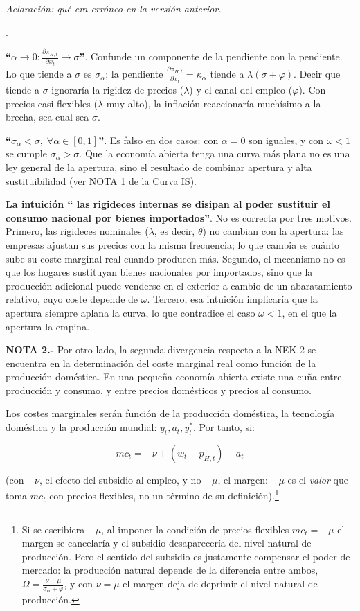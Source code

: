 \documentclass[10pt,a4paper]{article}
\newcounter{numitem}
\newenvironment{lnum}
      {\begin{list}{\arabic{numitem}.}{%
          \usecounter{numitem}%
          \setlength{\leftmargin}{1cm}%
          \setlength{\parskip}{3pt}%
          \setlength{\itemsep}{0pt}%
          \setlength{\parsep}{0pt}%
      }}
      {\end{list}}
\begin{document}
\textit{Aclaración: qué era erróneo en la versión anterior.}
\begin{lnum}
    \item \textbf{``$\alpha\to0:\frac{\partial\pi_{H,t}}{\partial x_t}\to\sigma$''}. Confunde un componente de la pendiente con la pendiente. Lo que tiende a $\sigma$ es $\sigma_\alpha$; la pendiente $\frac{\partial\pi_{H,t}}{\partial x_t}=\kappa_\alpha$ tiende a $\lambda(\sigma+\varphi)$. Decir que tiende a $\sigma$ ignoraría la rigidez de precios ($\lambda$) y el canal del empleo ($\varphi$). Con precios casi flexibles ($\lambda$ muy alto), la inflación reaccionaría muchísimo a la brecha, sea cual sea $\sigma$.
    \item \textbf{``$\sigma_\alpha<\sigma,\;\forall\alpha\in[0,1]$''}. Es falso en dos casos: con $\alpha=0$ son iguales, y con $\omega<1$ se cumple $\sigma_\alpha>\sigma$. Que la economía abierta tenga una curva más plana no es una ley general de la apertura, sino el resultado de combinar apertura y alta sustituibilidad (ver NOTA 1 de la Curva IS).
    \item \textbf{La intuición `` las rigideces internas se disipan al poder sustituir el consumo nacional por bienes importados''}. No es correcta por tres motivos. Primero, las rigideces nominales ($\lambda$, es decir, $\theta$) no cambian con la apertura: las empresas ajustan sus precios con la misma frecuencia; lo que cambia es cuánto sube su coste marginal real cuando producen más. Segundo, el mecanismo no es que los hogares sustituyan bienes nacionales por importados, sino que la producción adicional puede venderse en el exterior a cambio de un abaratamiento relativo, cuyo coste depende de $\omega$. Tercero, esa intuición implicaría que la apertura siempre aplana la curva, lo que contradice el caso $\omega<1$, en el que la apertura la empina.
\end{lnum}

\textbf{NOTA 2.-} Por otro lado, la segunda divergencia respecto a la NEK-2 se encuentra en la determinación del coste marginal real como función de la producción doméstica. En una pequeña economía abierta existe una cuña entre producción y consumo, y entre precios domésticos y precios al consumo. 

Los costes marginales serán función de la producción doméstica, la tecnología doméstica y la producción mundial: $y_t,a_t, y_t^*$. Por tanto, si:

$$mc_t = -\nu + (w_t - p_{H,t}) - a_t$$

(con $-\nu$, el efecto del subsidio al empleo, y no $-\mu$, el margen: $-\mu$ es el \textit{valor} que toma $mc_t$ con precios flexibles, no un término de su definición).\footnote{%
Si se escribiera $-\mu$, al imponer la condición de precios flexibles $mc_t=-\mu$ el margen se cancelaría y el subsidio desaparecería del nivel natural de producción. Pero el sentido del subsidio es justamente compensar el poder de mercado: la producción natural depende de la diferencia entre ambos, $\Omega=\frac{\nu-\mu}{\sigma_\alpha+\varphi}$, y con $\nu=\mu$ el margen deja de deprimir el nivel natural de producción.
%
}
\end{document}
